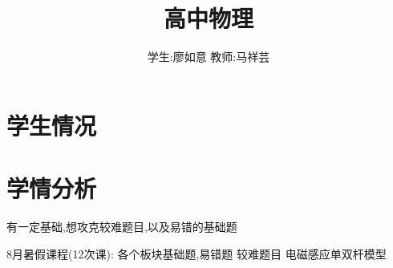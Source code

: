 \documentclass{article}
\title{高中物理}
\author{学生:\quad 廖如意 \quad 教师:\quad 马祥芸}
\begin{document}
    \maketitle
    \tableofcontents
    \newpage

    \section{学生情况}
    \begin{center}
    \end{center}
        
    \section{学情分析}

    有一定基础,想攻克较难题目,以及易错的基础题

    8月暑假课程(12次课):
    各个板块基础题,易错题
    较难题目
    电磁感应单双杆模型
\end{document}
